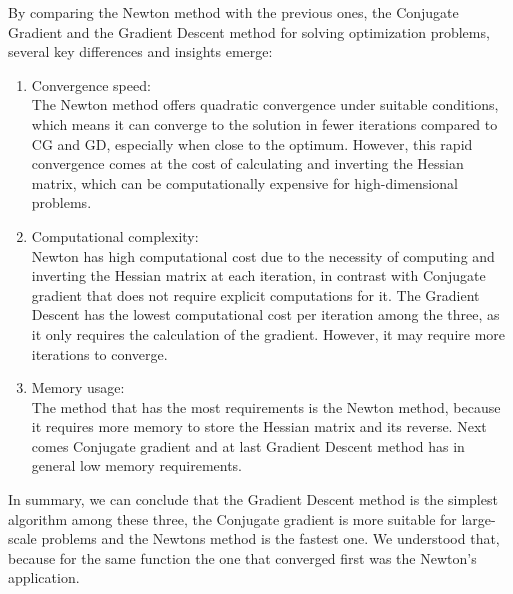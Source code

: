 By comparing the Newton method with the previous ones, the Conjugate Gradient and the Gradient Descent method for solving optimization problems, several key differences and insights emerge:
\begin{enumerate}
	\item Convergence speed:\\
	The Newton method offers quadratic convergence under suitable conditions, which means it can converge to the solution in fewer iterations compared to CG and GD, especially when close to the optimum. However, this rapid convergence comes at the cost of calculating and inverting the Hessian matrix, which can be computationally expensive for high-dimensional problems.
	\item Computational complexity:\\
	Newton has high computational cost due to the necessity of computing and inverting the Hessian matrix at each iteration, in contrast with Conjugate gradient that does not require explicit computations for it. The Gradient Descent has the lowest computational cost per iteration among the three, as it only requires the calculation of the gradient. However, it may require more iterations to converge.
	\item Memory usage:\\
	The method that has the most requirements is the Newton method, because it requires more memory to store the Hessian matrix and its reverse. Next comes Conjugate gradient and at last Gradient Descent method has in general low memory requirements.
\end{enumerate}

In summary, we can conclude that the Gradient Descent method is the simplest algorithm among these three, the Conjugate gradient is more suitable for large-scale problems and the Newtons method is the fastest one. We understood that, because for the same function the one that converged first was the Newton's application. 



